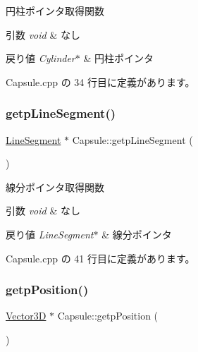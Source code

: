 円柱ポインタ取得関数 


\begin{DoxyParams}{引数}
{\em void} & なし \\
\hline
\end{DoxyParams}

\begin{DoxyRetVals}{戻り値}
{\em Cylinder$\ast$} & 円柱ポインタ \\
\hline
\end{DoxyRetVals}


 Capsule.\+cpp の 34 行目に定義があります。

\mbox{\label{class_capsule_aadd6a7e5e20796e3f591b83cc406070e}} 
\subsubsection{\texorpdfstring{getp\+Line\+Segment()}{getpLineSegment()}}
{\footnotesize\ttfamily \mbox{\hyperlink{class_line_segment}{Line\+Segment}} $\ast$ Capsule\+::getp\+Line\+Segment (\begin{DoxyParamCaption}{ }\end{DoxyParamCaption})}



線分ポインタ取得関数 


\begin{DoxyParams}{引数}
{\em void} & なし \\
\hline
\end{DoxyParams}

\begin{DoxyRetVals}{戻り値}
{\em Line\+Segment$\ast$} & 線分ポインタ \\
\hline
\end{DoxyRetVals}


 Capsule.\+cpp の 41 行目に定義があります。

\mbox{\label{class_capsule_ab0f3be95228fef65ef04d444aa5bcddd}} 
\subsubsection{\texorpdfstring{getp\+Position()}{getpPosition()}}
{\footnotesize\ttfamily \mbox{\hyperlink{class_vector3_d}{Vector3D}} $\ast$ Capsule\+::getp\+Position (\begin{DoxyParamCaption}{ }\end{DoxyParamCaption})}



